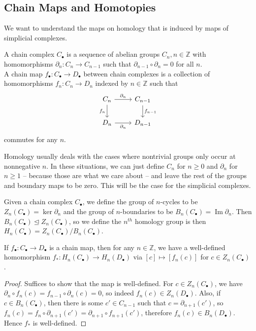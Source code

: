\subsection{Chain Maps and Homotopies}
We want to understand the maps on homology that is induced by maps of simplicial complexes.
\begin{definition}
    A chain complex $C_\bullet$ is a sequence of abelian groups $C_n,n\in\mathbb Z$ with homomorphisms $\partial_n:C_n\to C_{n-1}$ such that $\partial_{n-1}\circ\partial_n=0$ for all $n$.\\
    A chain map $f_\bullet:C_\bullet\to D_\bullet$ between chain complexes is a collection of homomorphisms $f_n:C_n\to D_n$ indexed by $n\in\mathbb Z$ such that
    \[
        \begin{tikzcd}
            C_n\arrow{r}{\partial_n}\arrow[swap]{d}{f_n}&C_{n-1}\arrow{d}{f_{n-1}}\\
            D_n\arrow[swap]{r}{\partial_n}&D_{n-1}
        \end{tikzcd}
    \]
    commutes for any $n$.
\end{definition}
Homology usually deals with the cases where nontrivial groups only occur at nonnegative $n$.
In these situations, we can just define $C_n$ for $n\ge 0$ and $\partial_n$ for $n\ge 1$ -- because those are what we care about -- and leave the rest of the groups and boundary maps to be zero.
This will be the case for the simplicial complexes.
\begin{definition}
    Given a chain complex $C_\bullet$, we define the group of $n$-cycles to be $Z_n(C_\bullet)=\ker\partial_n$ and the group of $n$-boundaries to be $B_n(C_\bullet)=\operatorname{Im}\partial_n$.
    Then $B_n(C_\bullet)\unlhd Z_n(C_\bullet)$, so we define the $n^{th}$ homology group is then $H_n(C_\bullet)=Z_n(C_\bullet)/B_n(C_\bullet)$.
\end{definition}
\begin{lemma}
    If $f_\bullet:C_\bullet\to D_\bullet$ is a chain map, then for any $n\in\mathbb Z$, we have a well-defined homomorphism $f_\ast:H_n(C_\bullet)\to H_n(D_\bullet)$ via $[c]\mapsto [f_n(c)]$ for $c\in Z_n(C_\bullet)$.
\end{lemma}
\begin{proof}
    Suffices to show that the map is well-defined.
    For $c\in Z_n(C_\bullet)$, we have $\partial_n\circ f_n(c)=f_{n-1}\circ\partial_n(c)=0$, so indeed $f_n(c)\in Z_n(D_\bullet)$.
    Also, if $c\in B_n(C_\bullet)$, then there is some $c'\in C_{n-1}$ such that $c=\partial_{n+1}(c')$, so $f_n(c)=f_n\circ\partial_{n+1}(c')=\partial_{n+1}\circ f_{n+1}(c')$, therefore $f_n(c)\in B_n(D_\bullet)$.
    Hence $f_\ast$ is well-defined.
\end{proof}
